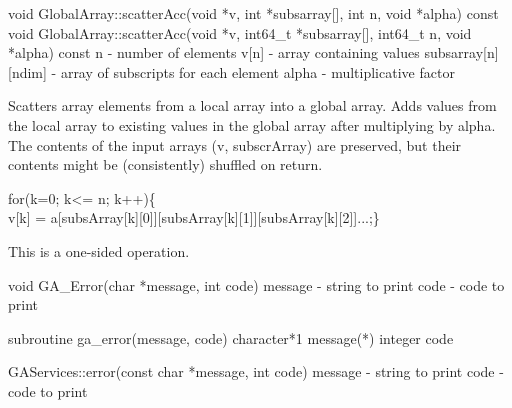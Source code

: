 \documentclass[12pt]{article}
\begin{document}
\begin{cxxapi}
void GlobalArray::scatterAcc(void *v, int *subsarray[], int n, void *alpha) const
void GlobalArray::scatterAcc(void *v, int64_t *subsarray[],
                             int64_t n, void *alpha) const
   n                  - number of elements                                \access{[input]}
   v[n]               -  array containing values                          \access{[input]}
   subsarray[n][ndim] -  array of subscripts for each element             \access{[input]}
   alpha              - multiplicative factor                             \access{[input]} 
\end{cxxapi}

\begin{desc}

Scatters array elements from a local array into a global array. Adds values from the local array to existing values in the global array after multiplying by alpha. The contents of the input arrays (v, subscrArray) are preserved, but their contents might be (consistently) shuffled on return.
   
for(k=0; k<= n; k++)\{\\v[k] = a[subsArray[k][0]][subsArray[k][1]][subsArray[k][2]]...;\}\   

This is a one-sided operation.

\end{desc}


\begin{capi}
void GA_Error(char *message, int code)
   message    - string to print                                           \access{[input]} 
   code       - code to print                                             \access{[input]} 
\end{capi}
\begin{fapi}
subroutine ga_error(message, code)
   character*1  message(*)                                                \access{[input]} 
   integer      code                                                      \access{[input]} 
\end{fapi}

\begin{cxxapi}
GAServices::error(const char *message, int code)
   message                    - string to print                           \access{[input]}
   code                       - code to print                             \access{[input]}
\end{cxxapi}
\end{document}
